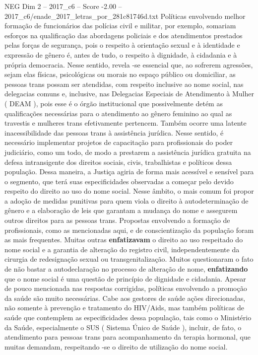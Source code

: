 \begin{textsample}{NEG Dim 2 – 2017\_c6 – Score -2.00 – 2017\_c6/enade\_2017\_letras\_por\_281c81746d.txt}
Políticas envolvendo melhor formação de funcionários das polícias civil e militar, por exemplo, somariam esforços na qualificação das abordagens policiais e dos atendimentos prestados pelas forças de segurança, pois o respeito à orientação sexual e à identidade e expressão de gênero é, antes de tudo, o respeito à dignidade, à cidadania e à própria democracia.
Nesse sentido, revela -se essencial que, ao sofrerem agressões, sejam elas físicas, psicológicas ou morais no espaço público ou domiciliar, as pessoas trans possam ser atendidas, com respeito inclusive ao nome social, nas delegacias comuns e, inclusive, nas Delegacias Especiais de Atendimento à Mulher ( DEAM ), pois esse é o órgão institucional que possivelmente detém as qualificações necessárias para o atendimento ao gênero feminino ao qual as travestis e mulheres trans efetivamente pertencem.
Também ocorre uma latente inacessibilidade das pessoas trans à assistência jurídica.
Nesse sentido, é necessário implementar projetos de capacitação para profissionais do poder judiciário, como um todo, de modo a prestarem a assistência jurídica gratuita na defesa intransigente dos direitos sociais, civis, trabalhistas e políticos dessa população.
Dessa maneira, a Justiça agiria de forma mais acessível e sensível para o segmento, que terá suas especificidades observadas a começar pelo devido respeito do direito ao uso do nome social.
Nesse âmbito, o mais comum foi propor a adoção de medidas punitivas para quem viola o direito à autodeterminação de gênero e a elaboração de leis que garantam a mudança do nome e assegurem outros direitos para as pessoas trans.
Propostas envolvendo a formação de profissionais, como as mencionadas aqui, e de conscientização da população foram as mais frequentes.
Muitas outras \textbf{enfatizavam} o direito ao uso respeitado do nome social e a garantia de alteração do registro civil, independentemente da cirurgia de redesignação sexual ou transgenitalização.
Muitos questionaram o fato de não bastar a autodeclaração no processo de alteração de nome, \textbf{enfatizando} que o nome social é uma questão de princípio de dignidade e cidadania.
Apesar de pouco mencionada nas respostas corrigidas, políticas envolvendo a promoção da saúde são muito necessárias.
Cabe aos gestores de saúde ações direcionadas, não somente à prevenção e tratamento do HIV/Aids, mas também políticas de saúde que contemplem as especificidades dessa população, tais como o Ministério da Saúde, especialmente o SUS ( Sistema Único de Saúde ), incluir, de fato, o atendimento para pessoas trans para acompanhamento da terapia hormonal, que muitas demandam, respeitando -se o direito de utilização do nome social.

\end{textsample}
